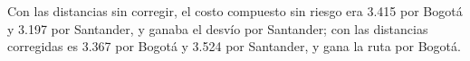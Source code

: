 Con las distancias sin corregir, el costo compuesto sin riesgo era 3.415 por Bogotá y 3.197 por Santander, y ganaba el desvío por Santander; con las distancias corregidas es 3.367 por Bogotá y 3.524 por Santander, y gana la ruta por Bogotá.
